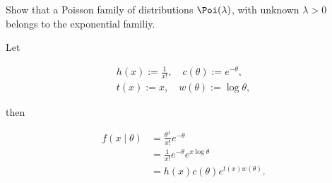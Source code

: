 
\begin{exercise}

Show that a Poisson family of distributions $\Poi(\lambda)$, with unknown $\lambda > 0$ belongs to the exponential familiy.

\end{exercise}


\begin{solution}

Let

\begin{gather*}
    h(x) := \frac{1}{x!},
    \quad
    c(\theta) := e^{-\theta}, \\
    t(x) := x,
    \quad
    w(\theta) := \log \theta,
\end{gather*}

then

\begin{align*}
    f(x \mid \theta)
    & =
    \frac{\theta^x}{x!} e^{-\theta} \\
    & =
    \frac{1}{x!} e^{-\theta} e^{x \log \theta} \\
    & =
    h(x) c(\theta) e^{t(x) w(\theta)}.
\end{align*}

\end{solution}


